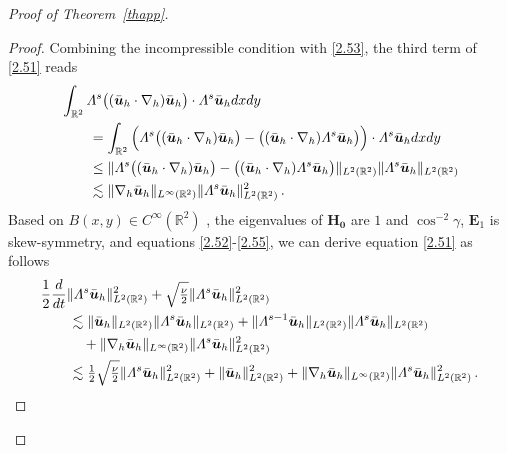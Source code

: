 \documentclass[pdflatex,sn-mathphys-num]{sn-jnl}%
\theoremstyle{thmstyleone}%
\theoremstyle{thmstyletwo}%
\theoremstyle{thmstylethree}%
\theoremstyle{thmstyletwo}
\begin{document}
\begin{proof}[Proof of Theorem~{\upshape\ref{thapp}}]
\begin{proof}
	
	Combining the incompressible condition with \eqref{2.53}, the third term of \eqref{2.51} reads
	\begin{align}\label{2.55}
		&\int_{\mathbb{R}^2}
		\varLambda^s\big(
		(\bar {\boldsymbol u}_h \cdot \nabla_h) \bar {\boldsymbol u}_h
		\big)
		\cdot
		\varLambda^s
		\bar {\boldsymbol u}_h
		dxdy\notag\\	
		&\qquad=	
		\int_{\mathbb{R}^2}
		\Big(
		\varLambda^s\big(
		(\bar {\boldsymbol u}_h \cdot \nabla_h) \bar {\boldsymbol u}_h
		\big)
		-
		\big(
		(\bar {\boldsymbol u}_h \cdot \nabla_h) \varLambda^s\bar {\boldsymbol u}_h
		\big)
		\Big)
		\cdot
		\varLambda^s
		\bar {\boldsymbol u}_h
		dxdy\notag\\	
		&\qquad\leq
		\lVert
		\varLambda^s\big(
		(\bar {\boldsymbol u}_h \cdot \nabla_h) \bar {\boldsymbol u}_h
		\big)
		-
		\big(
		(\bar {\boldsymbol u}_h \cdot \nabla_h) \varLambda^s\bar {\boldsymbol u}_h
		\big)
		\rVert_{L^2(\mathbb{R}^2)}
		\lVert\varLambda^s\bar {\boldsymbol u}_h\rVert_{L^2(\mathbb{R}^2)}\notag\\
		&\qquad\lesssim
		\lVert\nabla_h  \bar {\boldsymbol u}_h\rVert_{L^\infty(\mathbb{R}^2)}
		\lVert\varLambda^s\bar {\boldsymbol u}_h\rVert_{L^2(\mathbb{R}^2)}^2
		\,.
	\end{align}
	Based on  $B(x,y)\in C^\infty(\mathbb{R}^2)$ , the eigenvalues of $\boldsymbol{H_0}$ are $1$ and $\cos^{-2}\gamma$, $\boldsymbol{E}_1$ is skew-symmetry, and equations \eqref{2.52}-\eqref{2.55}, we can derive equation \eqref{2.51} as follows
	\begin{align}\label{2.56}
		&\frac12\frac{d}{dt}\lVert\varLambda^s\bar {\boldsymbol u}_h\rVert_{L^2(\mathbb{R}^2)}^2			
		+
		\sqrt{\tfrac{\nu}{2}}
		\lVert\varLambda^s\bar {\boldsymbol u}_h\rVert_{L^2(\mathbb{R}^2)}^2
		\notag\\
		&\qquad\lesssim
		\lVert
		\bar{\boldsymbol u}_h
		\rVert_{L^2(\mathbb{R}^2)}
		\lVert\varLambda^s\bar{\boldsymbol u}_h\rVert_{L^2(\mathbb{R}^2)}
		+
		\lVert\varLambda^{s-1}\bar{\boldsymbol u}_h\rVert_{L^2(\mathbb{R}^2)}
		\lVert\varLambda^s\bar{\boldsymbol u}_h\rVert_{L^2(\mathbb{R}^2)}\notag\\
		&\qquad\quad+\lVert\nabla_h  \bar {\boldsymbol u}_h\rVert_{L^\infty(\mathbb{R}^2)}
		\lVert\varLambda^s\bar{\boldsymbol u}_h\rVert_{L^2(\mathbb{R}^2)}^2
		\notag\\
		&\qquad	\lesssim
		\tfrac12\sqrt{\tfrac{\nu}{2}}
		\lVert\varLambda^s\bar {\boldsymbol u}_h\rVert_{L^2(\mathbb{R}^2)}^2
		+
		\lVert
		\bar{\boldsymbol u}_h
		\rVert_{L^2(\mathbb{R}^2)}^2+\lVert\nabla_h  \bar {\boldsymbol u}_h\rVert_{L^\infty(\mathbb{R}^2)}
		\lVert\varLambda^s\bar{\boldsymbol u}_h\rVert_{L^2(\mathbb{R}^2)}^2\,.
	\end{align}
	

\end{proof}
\end{proof}
\end{document}
